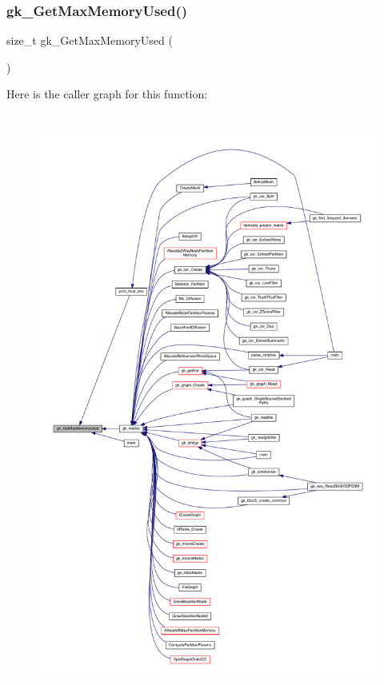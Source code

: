 \subsubsection{\texorpdfstring{gk\+\_\+\+Get\+Max\+Memory\+Used()}{gk\_GetMaxMemoryUsed()}}
{\footnotesize\ttfamily size\+\_\+t gk\+\_\+\+Get\+Max\+Memory\+Used (\begin{DoxyParamCaption}{ }\end{DoxyParamCaption})}

Here is the caller graph for this function\+:\nopagebreak
\begin{figure}[H]
\begin{center}
\leavevmode
\includegraphics[height=550pt]{a00077_a656fd5266ae12a96e53125486f8fea52_icgraph}
\end{center}
\end{figure}
\mbox{\label{a00077_a1240fb254ce7cf24839fa5bb4ba20ff9}} 
